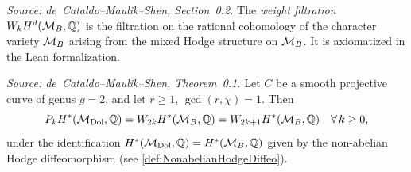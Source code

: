 \begin{definition}
  \label{def:WeightFiltration}
  \textit{Source: de~Cataldo--Maulik--Shen, Section~0.2.}
  The \emph{weight filtration} \(W_k H^d(\mathcal{M}_B, \mathbb{Q})\) is the filtration on
  the rational cohomology of the character variety \(\mathcal{M}_B\) arising from the
  mixed Hodge structure on \(\mathcal{M}_B\).  It is axiomatized in the Lean
  formalization.
\end{definition}

\begin{theorem}[P=W for genus~2]
  \label{thm:PW_genus2}
  \textit{Source: de~Cataldo--Maulik--Shen, Theorem~0.1.}
  Let \(C\) be a smooth projective curve of genus \(g = 2\), and let
  \(r \geq 1\), \(\gcd(r,\chi) = 1\).  Then
  \[
    P_k H^*(\mathcal{M}_{\mathrm{Dol}}, \mathbb{Q}) = W_{2k} H^*(\mathcal{M}_B, \mathbb{Q}) = W_{2k+1} H^*(\mathcal{M}_B, \mathbb{Q})
    \quad \forall\, k \geq 0,
  \]
  under the identification \(H^*(\mathcal{M}_{\mathrm{Dol}},\mathbb{Q}) = H^*(\mathcal{M}_B,\mathbb{Q})\) given by the
  non-abelian Hodge diffeomorphism (see \cref{def:NonabelianHodgeDiffeo}).
\end{theorem}


